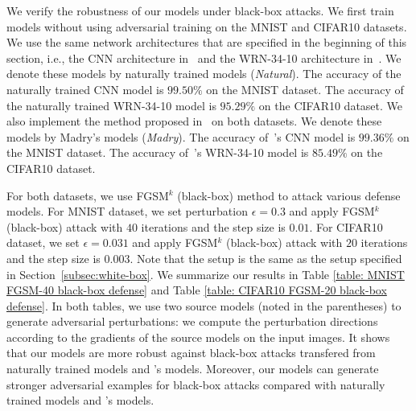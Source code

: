 \documentclass[11pt]{article}
\newcommand{\0}{\mathbf{0}}
\newcommand{\1}{\mathbf{1}}
\begin{document}
We verify the robustness of our models under black-box attacks. We first train models without using adversarial training on the MNIST and CIFAR10 datasets. We use the same network architectures that are specified in the beginning of this section, i.e., the CNN architecture in~\cite{carlini2017towards} and the WRN-34-10 architecture in~\cite{zagoruyko2016wide}. We denote these models by naturally trained models (\emph{Natural}). The accuracy of the naturally trained CNN model is $99.50\%$ on the MNIST dataset. The accuracy of the naturally trained WRN-34-10 model is $95.29\%$ on the CIFAR10 dataset. We also implement the method proposed in~\cite{madry2018towards} on both datasets. We denote these models by Madry's models (\emph{Madry}). The accuracy of~\cite{madry2018towards}'s CNN model is $99.36\%$ on the MNIST dataset. The accuracy of~\cite{madry2018towards}'s WRN-34-10 model is $85.49\%$ on the CIFAR10 dataset.


For both datasets, we use FGSM$^{k}$ (black-box) method to attack various defense models. For MNIST dataset, we set perturbation $\epsilon=0.3$ and apply FGSM$^k$ (black-box) attack with $40$ iterations and the step size is $0.01$. For CIFAR10 dataset, we set $\epsilon=0.031$ and apply FGSM$^k$ (black-box) attack with $20$ iterations and the step size is $0.003$. Note that the setup is the same as the setup specified in Section~\ref{subsec:white-box}. We summarize our results in Table \ref{table: MNIST FGSM-40 black-box defense} and Table \ref{table: CIFAR10 FGSM-20 black-box defense}. In both tables, we use two source models (noted in the parentheses) to generate adversarial perturbations: we compute the perturbation directions according to the gradients of the source models on the input images. It shows that our models are more robust against black-box attacks transfered from naturally trained models and \cite{madry2018towards}'s models. Moreover, our models can generate stronger adversarial examples for black-box attacks compared with naturally trained models and \cite{madry2018towards}'s models.
\end{document}

